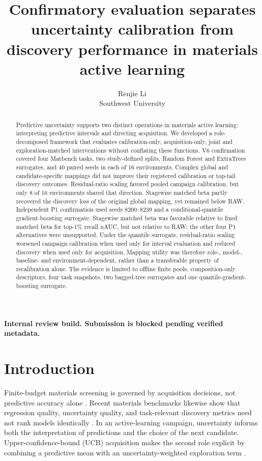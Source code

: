 \documentclass[10pt]{article}
\title{Confirmatory evaluation separates uncertainty calibration from discovery performance in materials active learning}
\author{Renjie Li\\[2pt]\normalsize Southwest University}
\date{}
\begin{document}
\maketitle
\begin{center}\small\textbf{Internal review build. Submission is blocked pending verified metadata.}\end{center}

\begin{abstract}
Predictive uncertainty supports two distinct operations in materials active learning: interpreting predictive intervals and directing acquisition. We developed a role-decomposed framework that evaluates calibration-only, acquisition-only, joint and exploration-matched interventions without conflating these functions. V6 confirmation covered four Matbench tasks, two study-defined splits, Random Forest and ExtraTrees surrogates, and 40 paired seeds in each of 16 environments. Complex global and candidate-specific mappings did not improve their registered calibration or top-tail discovery outcomes. Residual-ratio scaling favored pooled campaign calibration, but only 8 of 16 environments shared that direction. Stagewise matched beta partly recovered the discovery loss of the original global mapping, yet remained below RAW. Independent P1 confirmation used seeds 8200--8239 and a conditional-quantile gradient-boosting surrogate. Stagewise matched beta was favorable relative to fixed matched beta for top-1\% recall nAUC, but not relative to RAW; the other four P1 alternatives were unsupported. Under the quantile surrogate, residual-ratio scaling worsened campaign calibration when used only for interval evaluation and reduced discovery when used only for acquisition. Mapping utility was therefore role-, model-, baseline- and environment-dependent, rather than a transferable property of recalibration alone. The evidence is limited to offline finite pools, composition-only descriptors, four task snapshots, two bagged-tree surrogates and one quantile-gradient-boosting surrogate.
\end{abstract}

\section{Introduction}
Finite-budget materials screening is governed by acquisition decisions, not
predictive accuracy alone
\citep{lookman2019active,xue2016adaptive,kusne2020closedloop,rohr2020metrics,hase2021olympus}.
Recent materials benchmarks likewise show that regression quality, uncertainty
quality, and task-relevant discovery metrics need not rank models identically
\citep{varivoda2023uq,riebesell2025matbenchdiscovery}. In an active-learning
campaign, uncertainty informs both the interpretation of predictions and the
choice of the next candidate. Upper-confidence-bound (UCB) acquisition makes
the second role explicit by combining a predictive mean with an
uncertainty-weighted exploration term
\citep{auer2002ucb,srinivas2010gpucb,shahriari2016bo,frazier2018tutorial}.
\end{document}
